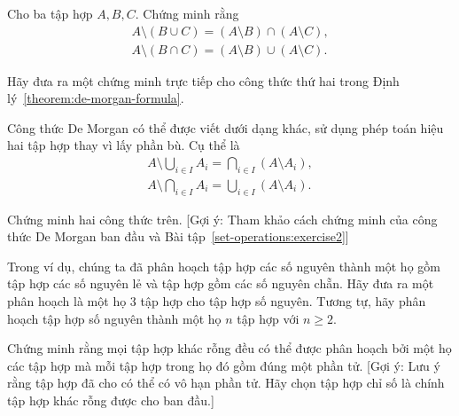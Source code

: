 \begin{exercise}\label{set-operations:exercise2}
    Cho ba tập hợp $A, B, C$. Chứng minh rằng
    \begin{equation*}
        \begin{split}
            A \setminus (B\cup C) = (A \setminus B) \cap (A \setminus C), \\
            A \setminus (B\cap C) = (A \setminus B) \cup (A \setminus C).
        \end{split}
    \end{equation*}
\end{exercise}

\begin{exercise}\label{set-operations:exercise3}
    Hãy đưa ra một chứng minh trực tiếp cho công thức thứ hai trong Định lý~\ref{theorem:de-morgan-formula}.
\end{exercise}

\begin{exercise}\label{set-operations:exercise4}
    Công thức De Morgan có thể được viết dưới dạng khác, sử dụng phép toán hiệu hai tập hợp thay vì lấy phần bù. Cụ thể là
    \begin{equation*}
        \begin{split}
            A \setminus \bigcup_{i\in I}A_{i} = \bigcap_{i\in I}{(A \setminus A_{i})}, \\
            A \setminus \bigcap_{i\in I}A_{i} = \bigcup_{i\in I}{(A \setminus A_{i})}.
        \end{split}
    \end{equation*}

    Chứng minh hai công thức trên. [Gợi ý: Tham khảo cách chứng minh của công thức De Morgan ban đầu và Bài tập~\ref{set-operations:exercise2}]
\end{exercise}

\begin{exercise}\label{set-operations:exercise5}
    Trong ví dụ, chúng ta đã phân hoạch tập hợp các số nguyên thành một họ gồm tập hợp các số nguyên lẻ và tập hợp gồm các số nguyên chẵn. Hãy đưa ra một phân hoạch là một họ 3 tập hợp cho tập hợp số nguyên. Tương tự, hãy phân hoạch tập hợp số nguyên thành một họ $n$ tập hợp với $n\geq 2$.
\end{exercise}

\begin{exercise}\label{set-operations:exercise6}
    Chứng minh rằng mọi tập hợp khác rỗng đều có thể được phân hoạch bởi một họ các tập hợp mà mỗi tập hợp trong họ đó gồm đúng một phần tử. [Gợi ý: Lưu ý rằng tập hợp đã cho có thể có vô hạn phần tử. Hãy chọn tập hợp chỉ số là chính tập hợp khác rỗng được cho ban đầu.]
\end{exercise}

